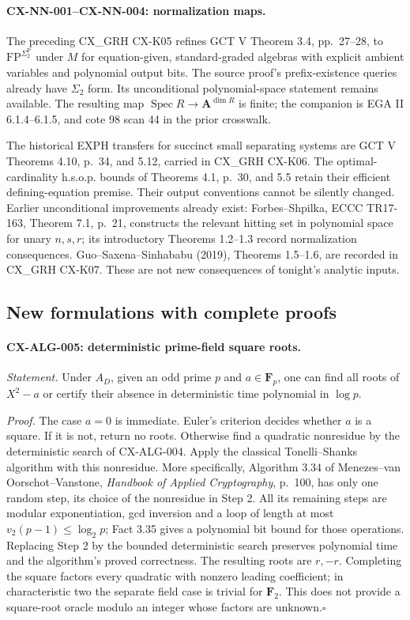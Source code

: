 \paragraph{CX-NN-001--CX-NN-004: normalization maps.}
The preceding CX\_GRH CX-K05 refines GCT V Theorem 3.4, pp.~27--28, to
$\mathrm{FP}^{\Sigma_2^{\mathrm P}}$ under $M$ for equation-given,
standard-graded algebras with explicit ambient variables and polynomial
output bits. The source proof's prefix-existence queries already have
$\Sigma_2$ form. Its unconditional polynomial-space statement remains
available. The resulting map
$\operatorname{Spec}R\to\mathbf A^{\dim R}$ is finite; the companion is
EGA II 6.1.4--6.1.5, and cote 98 scan 44 in the prior crosswalk.

The historical EXPH transfers for succinct small separating systems are
GCT V Theorems 4.10, p.~34, and 5.12, carried in CX\_GRH CX-K06. The
optimal-cardinality h.s.o.p. bounds of Theorems 4.1, p.~30, and 5.5 retain
their efficient defining-equation premise. Their output conventions cannot
be silently changed. Earlier unconditional improvements already exist:
Forbes--Shpilka, ECCC TR17-163, Theorem 7.1, p.~21, constructs the relevant
hitting set in polynomial space for unary $n,s,r$; its introductory
Theorems 1.2--1.3 record normalization consequences. Guo--Saxena--Sinhababu
(2019), Theorems 1.5--1.6, are recorded in CX\_GRH CX-K07. These are not
new consequences of tonight's analytic inputs.

\subsection{New formulations with complete proofs}

\paragraph{CX-ALG-005: deterministic prime-field square roots.}
\emph{Statement.} Under $A_D$, given an odd prime $p$ and $a\in\mathbf F_p$,
one can find all roots of $X^2-a$ or certify their absence in deterministic
time polynomial in $\log p$.

\emph{Proof.} The case $a=0$ is immediate. Euler's criterion decides whether
$a$ is a square. If it is not, return no roots. Otherwise find a quadratic
nonresidue by the deterministic search of CX-ALG-004. Apply the classical
Tonelli--Shanks algorithm with this nonresidue. More specifically, Algorithm
3.34 of Menezes--van Oorschot--Vanstone, \emph{Handbook of Applied Cryptography},
p.~100, has only one random step, its choice of the nonresidue in Step 2.
All its remaining steps are modular exponentiation, gcd inversion and a
loop of length at most $v_2(p-1)\leq\log_2p$; Fact 3.35 gives a polynomial
bit bound for those operations. Replacing Step 2 by the bounded deterministic
search preserves polynomial time and the algorithm's proved correctness.
The resulting roots are $r,-r$. Completing the square factors every quadratic
with nonzero leading coefficient; in characteristic two the separate field
case is trivial for $\mathbf F_2$. This does not provide a square-root oracle
modulo an integer whose factors are unknown.\hfill$\square$

